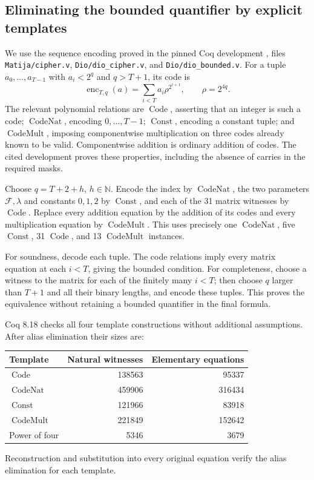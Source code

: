 \documentclass[11pt]{article}
\theoremstyle{definition}
\newcommand{\N}{\mathbb N}\newcommand{\F}{\mathbb F}
\begin{document}
\subsection{Eliminating the bounded quantifier by explicit templates}

We use the sequence encoding proved in the pinned Coq development
\cite{DPRMLibrary}, files \texttt{Matija/cipher.v},
\texttt{Dio/dio\_cipher.v}, and \texttt{Dio/dio\_bounded.v}.
For a tuple \(a_0,\ldots,a_{T-1}\) with \(a_i<2^q\) and
\(q>T+1\), its code is
\[
 \operatorname{enc}_{T,q}(a)
       =\sum_{i<T}a_i\rho^{2^{i+1}},\qquad \rho=2^{4q}.
\]
The relevant polynomial relations are \(\operatorname{Code}\),
asserting that an integer is such a code; \(\operatorname{CodeNat}\),
encoding \(0,\ldots,T-1\); \(\operatorname{Const}\), encoding a
constant tuple; and \(\operatorname{CodeMult}\), imposing componentwise
multiplication on three codes already known to be valid. Componentwise
addition is ordinary addition of codes. The cited development proves
these properties, including the absence of carries in the required masks.

Choose \(q=T+2+h\), \(h\in\N\). Encode the index by
\(\operatorname{CodeNat}\), the two parameters \(\mathcal F,\lambda\)
and constants \(0,1,2\) by \(\operatorname{Const}\), and each
of the 31 matrix witnesses by \(\operatorname{Code}\). Replace
every addition equation by the addition of its codes and every
multiplication equation by \(\operatorname{CodeMult}\).
This uses precisely one \(\operatorname{CodeNat}\), five
\(\operatorname{Const}\), 31 \(\operatorname{Code}\), and
13 \(\operatorname{CodeMult}\) instances.

For soundness, decode each tuple. The code relations imply every
matrix equation at each \(i<T\), giving the bounded condition.
For completeness, choose a witness to the matrix for each of the
finitely many \(i<T\); then choose \(q\) larger than \(T+1\)
and all their binary lengths, and encode these tuples. This proves
the equivalence without retaining a bounded quantifier in the final formula.

Coq 8.18 checks all four template constructions without additional
assumptions. After alias elimination their sizes are:
\begin{center}\small
\begin{tabular}{lrr}\toprule
Template & Natural witnesses & Elementary equations\\\midrule
\(\operatorname{Code}\)&138563&95337\\
\(\operatorname{CodeNat}\)&459906&316434\\
\(\operatorname{Const}\)&121966&83918\\
\(\operatorname{CodeMult}\)&221849&152642\\
Power of four&5346&3679\\\bottomrule
\end{tabular}
\end{center}
Reconstruction and substitution into every original equation verify
the alias elimination for each template.
\end{document}
